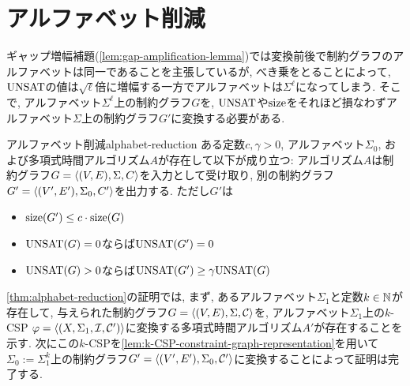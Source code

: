 \section{アルファベット削減}
ギャップ増幅補題(\cref{lem:gap-amplification-lemma})では変換前後で制約グラフのアルファベットは同一であることを主張しているが,
べき乗をとることによって, $\mathrm{UNSAT}$の値は$\sqrt{\ell}$倍に増幅する一方でアルファベットは$\Sigma^\ell$になってしまう.
そこで, アルファベット$\Sigma^\ell$上の制約グラフ$G$を, $\mathrm{UNSAT}$や$\mathrm{size}$をそれほど損なわずアルファベット$\Sigma$上の制約グラフ$G'$に変換する必要がある.
\begin{theorem}{アルファベット削減}{alphabet-reduction}
  ある定数$c,\gamma>0$, アルファベット$\Sigma_0$, および多項式時間アルゴリズム$A$が存在して以下が成り立つ:
  アルゴリズム$A$は制約グラフ$G=\langle(V,E),\Sigma,C\rangle$を入力として受け取り,
  別の制約グラフ$G'=\langle(V',E'),\Sigma_0,C'\rangle$を出力する.
  ただし$G'$は
  \begin{itemize}
    \item $\mathrm{size}(G') \le c\cdot \mathrm{size}(G)$
    \item $\mathrm{UNSAT}(G)=0$ならば$\mathrm{UNSAT}(G')=0$
    \item $\mathrm{UNSAT}(G)>0$ならば$\mathrm{UNSAT}(G') \ge \gamma\mathrm{UNSAT}(G)$
  \end{itemize}
\end{theorem}
\cref{thm:alphabet-reduction}の証明では,
  まず, あるアルファベット$\Sigma_1$と定数$k\in\mathbb{N}$が存在して,
  与えられた制約グラフ$G=\langle(V,E),\Sigma,\mathcal{C}\rangle$を, アルファベット$\Sigma_1$上の$k$-CSP $\varphi=\langle(X,\Sigma_1,\mathcal{I},\mathcal{C}')\rangle$に変換する多項式時間アルゴリズム$A'$が存在することを示す.
  次にこの$k$-CSPを\cref{lem:k-CSP-constraint-graph-representation}を用いて$\Sigma_0:=\Sigma_1^k$上の制約グラフ$G'=\langle(V',E'),\Sigma_0,\mathcal{C}'\rangle$に変換することによって証明は完了する.

